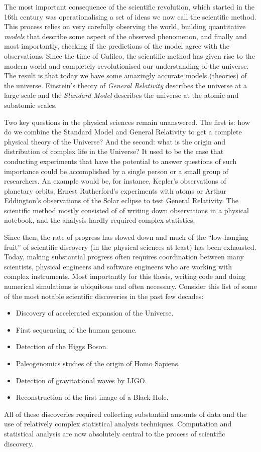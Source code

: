 \documentclass[12pt,dvipsnames]{report}
\begin{document}
The most important consequence of the scientific revolution, which started in the 16th 
century was operationalising a set of ideas we now call the scientific method.
This process relies on very carefully observing the world, building quantitative 
\emph{models} that describe some aspect 
of the observed phenomenon, and finally and most importantly, checking if the predictions 
of the model agree with the observations.
Since the time of Galileo, the scientific method has given rise to the modern world 
and completely revolutionised our understanding of the universe. The result 
is that today we have some amazingly accurate models (theories) of the universe.
Einstein's theory of \emph{General Relativity} describes the
universe at a large scale and the \emph{Standard Model} describes the
universe at the atomic and subatomic scales. 

Two key questions in the physical sciences remain unanswered. 
The first is: how do we combine the Standard Model and General Relativity to get a complete
physical theory of the Universe? And the second: what is the origin and distribution of complex 
life in the Universe?
It used to be the case that conducting experiments that have the potential to 
answer questions of such importance could be accomplished by a single person or  
a small group of researchers. 
An example would be, for instance, Kepler's observations of planetary orbits, Ernest
Rutherford's experiments with atoms or Arthur Eddington's observations of the
Solar eclipse to test General Relativity. The scientific method mostly consisted of 
of writing down observations in a physical notebook, and the analysis
hardly required complex statistics. 

Since then, the rate of progress has slowed down and much of the ``low-hanging fruit'' 
of scientific discovery (in the physical sciences at least) has been exhausted.
Today, making substantial progress often requires 
coordination between many scientists, physical engineers and software engineers 
who are working with complex instruments. Most importantly for this thesis, writing code
and doing numerical simulations is ubiquitous and often necessary.
Consider this list of some of the most notable
scientific discoveries in the past few decades:
\begin{itemize}
    \item  Discovery of accelerated expansion of the Universe.
    \item  First sequencing of the human genome.
    \item  Detection of the Higgs Boson.
    \item  Paleogenomics studies of the origin of Homo Sapiens.
    \item  Detection of gravitational waves by LIGO.
    \item  Reconstruction of the first image of a Black Hole.
\end{itemize}
All of these discoveries required collecting substantial amounts of data and the use of
relatively complex statistical analysis techniques.
Computation and statistical analysis are now absolutely central to the process of scientific
discovery.
\end{document}
